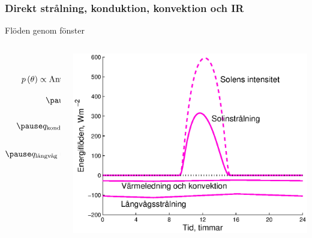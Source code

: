 \subsubsection{Direkt strålning, konduktion, konvektion och IR}
\begin{frame}{Flöden genom fönster}
  \begin{columns}
    \begin{column}{.48\textwidth}
      {\small
      \begin{eqnarray*}
        g\left( \theta \right) = g_0 \cdot p\left( \theta \right)\\[10pt]
        p\left( \theta \right) \propto \text{Antal rutor \& beläggningar}\\[10pt]
        \pause q_{\text{sol}} =  g\left( \theta \right) \cdot I_0 \cos{\left( \theta \right)}\\[10pt]
        \pause q_{\text{kond}} = \frac{1}{\frac{1}{U}+\frac{1}{h}} \left( T_{inne} - T_{ute}\right)\\[10pt]
        \pause q_{\text{långvåg}} = 0,75 \cdot \sigma \left( T_{inne}^4 - T_{ute}^4\right)
      \end{eqnarray*}
      }
    \end{column}


    \begin{column}{.5\textwidth}
      \pause
      \vspace{-30pt}
      \begin{center}
        \includegraphics[scale=0.4]{images/windows_flow.eps}
      \end{center}
    \end{column}
  \end{columns}
\end{frame}
